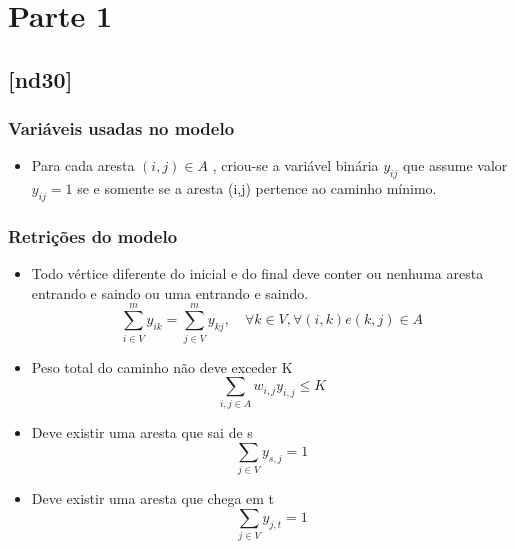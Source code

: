 \documentclass[11pt,letterpaper]{article}
\begin{document}
 
\section{Parte 1}

\subsection{{[}nd30{]}}
\subsubsection*{Variáveis usadas no modelo}
\begin{itemize}
\item Para cada aresta $(i,j) \in A$ , criou-se
a variável binária $y_{ij}$ que assume valor $y_{ij}=1$ se e somente se a aresta (i,j)
pertence ao caminho mínimo.
\end{itemize}

\subsubsection*{Retrições do modelo}
\begin{itemize}

\item Todo vértice diferente do inicial e do final deve conter ou
  nenhuma aresta entrando e saindo ou uma entrando e saindo.
\begin{equation*}
  \sum_{i \in V}^{m}y_{ik}=\sum_{j \in V}^{m}y_{kj},\quad \forall k \in V,
  \forall (i,k) e (k,j) \in A 
\end{equation*}

\item Peso total do caminho não deve exceder K
\begin{equation*}
\sum_{{i,j} \in A}w_{i,j}y_{i,j} \leq K
\end{equation*}

\item Deve existir uma aresta que sai de s
\begin{equation*}
\sum_{j \in V}y_{s,j} = 1 
\end{equation*}

\item Deve existir uma aresta que chega em t
\begin{equation*}
\sum_{j \in V}y_{j,t} = 1 
\end{equation*}

\end{itemize}
\end{document}

